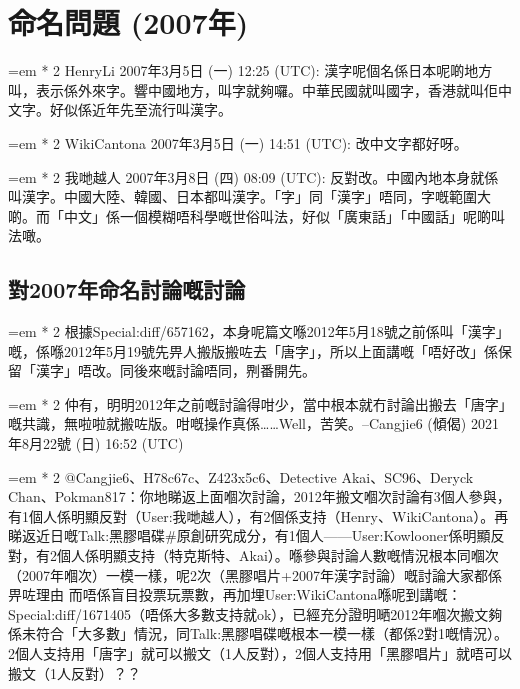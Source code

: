 

\newcommand{\ladder}[2]{%
  \par\noindent
  \begingroup
    \leftskip=\dimexpr #1em * 2\relax
    #2\par
  \endgroup
}

\chapter{命名問題 (2007年)}

\ladder{0}{HenryLi 2007年3月5日 (一) 12:25 (UTC):
漢字呢個名係日本呢啲地方叫，表示係外來字。響中國地方，叫字就夠囉。中華民國就叫國字，香港就叫佢中文字。好似係近年先至流行叫漢字。}

\ladder{1}{WikiCantona 2007年3月5日 (一) 14:51 (UTC):
改中文字都好呀。}

\ladder{2}{我哋越人 2007年3月8日 (四) 08:09 (UTC):
反對改。中國內地本身就係叫漢字。中國大陸、韓國、日本都叫漢字。「字」同「漢字」唔同，字嘅範圍大啲。而「中文」係一個模糊唔科學嘅世俗叫法，好似「廣東話」「中國話」呢啲叫法噉。}

\section{對2007年命名討論嘅討論}

\ladder{0}{根據Special:diff/657162，本身呢篇文喺2012年5月18號之前係叫「漢字」嘅，係喺2012年5月19號先畀人搬版搬咗去「唐字」，所以上面講嘅「唔好改」係保留「漢字」唔改。同後來嘅討論唔同，𠝹番開先。}

\ladder{0}{仲有，明明2012年之前嘅討論得咁少，當中根本就冇討論出搬去「唐字」嘅共識，無啦啦就搬咗版。咁嘅操作真係……Well，苦笑。--Cangjie6 (傾偈) 2021年8月22號 (日) 16:52 (UTC)}

\ladder{1}{@Cangjie6、H78c67c、Z423x5c6、Detective Akai、SC96、Deryck Chan、Pokman817：你地睇返上面嗰次討論，2012年搬文嗰次討論有3個人參與，有1個人係明顯反對（User:我哋越人），有2個係支持（Henry、WikiCantona）。再睇返近日嘅Talk:黑膠唱碟\#原創研究成分，有1個人——User:Kowlooner係明顯反對，有2個人係明顯支持（特克斯特、Akai）。喺參與討論人數嘅情況根本同嗰次（2007年嗰次）一模一樣，呢2次（黑膠唱片+2007年漢字討論）嘅討論大家都係畀咗理由 而唔係盲目投票玩票數，再加埋User:WikiCantona喺呢到講嘅：Special:diff/1671405（唔係大多數支持就ok），已經充分證明嗮2012年嗰次搬文夠係未符合「大多數」情況，同Talk:黑膠唱碟嘅根本一模一樣（都係2對1嘅情況）。2個人支持用「唐字」就可以搬文（1人反對），2個人支持用「黑膠唱片」就唔可以搬文（1人反對）？？}

